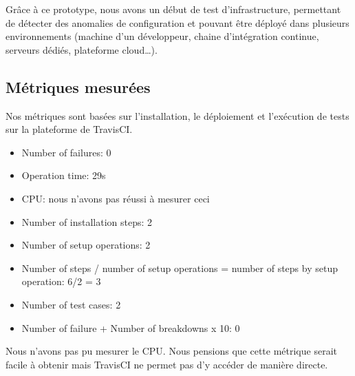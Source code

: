     Grâce à ce prototype, nous avons un début de test d'infrastructure, permettant de détecter des anomalies de configuration et pouvant être déployé dans plusieurs environnements (machine d'un développeur, chaine d'intégration continue, serveurs dédiés, plateforme cloud\dots).

\subsection{Métriques mesurées}
    Nos métriques sont basées sur l'installation, le déploiement et l'exécution de tests sur la plateforme de TravisCI.
    \begin{itemize}
        \item Number of failures: 0
        \item Operation time: 29s
        \item CPU: nous n'avons pas réussi à mesurer ceci
        \item Number of installation steps: 2
        \item Number of setup operations: 2
        \item Number of steps / number of setup operations = number of steps by setup operation: 6/2 = 3
        \item Number of test cases: 2
        \item Number of failure + Number of breakdowns x 10: 0
    \end{itemize}

    Nous n'avons pas pu mesurer le CPU. Nous pensions que cette métrique serait facile à obtenir mais TravisCI ne permet pas d'y accéder de manière directe.